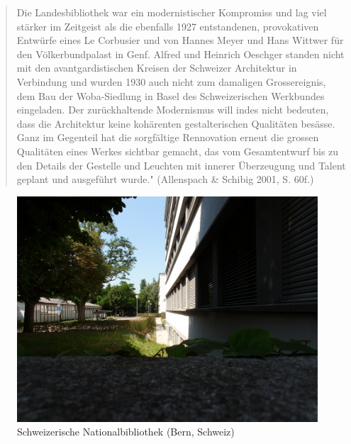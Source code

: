 \documentclass[a4paper,
fontsize=11pt,
oneside,
numbers=noperiodatend,
parskip=half-,
bibliography=totoc,
final
]{scrartcl}
\begin{document}
\begin{quote}
Die Landesbibliothek war ein modernistischer Kompromiss und lag viel
stärker im Zeitgeist als die ebenfalls 1927 entstandenen, provokativen
Entwürfe eines Le Corbusier und von Hannes Meyer und Hans Wittwer für
den Völkerbundpalast in Genf. Alfred und Heinrich Oeschger standen nicht
mit den avantgardistischen Kreisen der Schweizer Architektur in
Verbindung und wurden 1930 auch nicht zum damaligen Grossereignis, dem
Bau der Woba-Siedlung in Basel des Schweizerischen Werkbundes
eingeladen. Der zurückhaltende Modernismus will indes nicht bedeuten,
dass die Architektur keine kohärenten gestalterischen Qualitäten
besässe. Ganz im Gegenteil hat die sorgfältige Rennovation erneut die
grossen Qualitäten eines Werkes sichtbar gemacht, das vom Gesamtentwurf
bis zu den Details der Gestelle und Leuchten mit innerer Überzeugung und
Talent geplant und ausgeführt wurde." (Allenspach \& Schibig 2001, S.
60f.)
\end{quote}

\begin{figure}[htbp]
\centering
\includegraphics{./img/004.jpg}
\caption{Schweizerische Nationalbibliothek (Bern,
Schweiz)}
\end{figure}
\end{document}
